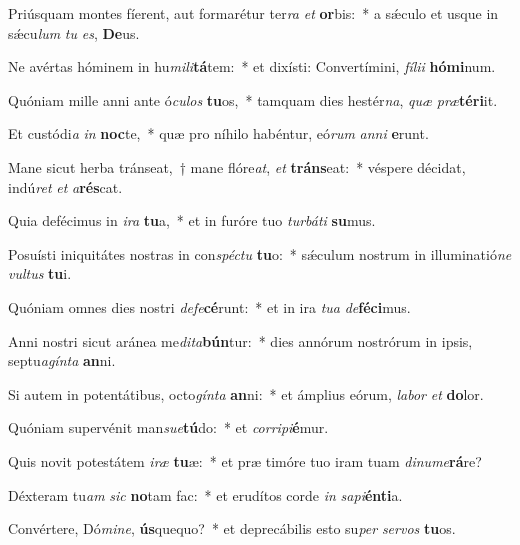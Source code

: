 \item Priúsquam montes fíerent, aut formarétur ter\textit{ra} \textit{et} \textbf{or}bis:~* a sǽculo et usque in sǽcu\textit{lum} \textit{tu} \textit{es}, \textbf{De}us.
\item Ne avértas hóminem in hu\textit{mi}\textit{li}\textbf{tá}tem:~* et dixísti: Convertímini, \textit{fí}\textit{li}\textit{i} \textbf{hó}\textbf{mi}num.
\item Quóniam mille anni ante ó\textit{cu}\textit{los} \textbf{tu}os,~* tamquam dies hestér\textit{na}, \textit{quæ} \textit{præ}\textbf{tér}\textbf{i}it.
\item Et custódi\textit{a} \textit{in} \textbf{noc}te,~* quæ pro níhilo habéntur, eó\textit{rum} \textit{an}\textit{ni} \textbf{e}runt.
\item Mane sicut herba tránseat,~† mane flóre\textit{at}, \textit{et} \textbf{tráns}eat:~* véspere décidat, indú\textit{ret} \textit{et} \textit{a}\textbf{rés}cat.
\item Quia defécimus in \textit{i}\textit{ra} \textbf{tu}a,~* et in furóre tuo \textit{tur}\textit{bá}\textit{ti} \textbf{su}mus.
\item Posuísti iniquitátes nostras in con\textit{spéc}\textit{tu} \textbf{tu}o:~* sǽculum nostrum in illuminatió\textit{ne} \textit{vul}\textit{tus} \textbf{tu}i.
\item Quóniam omnes dies nostri \textit{de}\textit{fe}\textbf{cé}runt:~* et in ira \textit{tu}\textit{a} \textit{de}\textbf{fé}\textbf{ci}mus.
\item Anni nostri sicut aránea me\textit{di}\textit{ta}\textbf{bún}tur:~* dies annórum nostrórum in ipsis, septu\textit{a}\textit{gín}\textit{ta} \textbf{an}ni.
\item Si autem in potentátibus, octo\textit{gín}\textit{ta} \textbf{an}ni:~* et ámplius eórum, \textit{la}\textit{bor} \textit{et} \textbf{do}lor.
\item Quóniam supervénit man\textit{su}\textit{e}\textbf{tú}do:~* et \textit{cor}\textit{ri}\textit{pi}\textbf{é}mur.
\item Quis novit potestátem \textit{i}\textit{ræ} \textbf{tu}æ:~* et præ timóre tuo iram tuam \textit{di}\textit{nu}\textit{me}\textbf{rá}re?
\item Déxteram tu\textit{am} \textit{sic} \textbf{no}tam fac:~* et erudítos corde \textit{in} \textit{sa}\textit{pi}\textbf{én}\textbf{ti}a.
\item Convértere, Dó\textit{mi}\textit{ne}, \textbf{ús}quequo?~* et deprecábilis esto su\textit{per} \textit{ser}\textit{vos} \textbf{tu}os.
